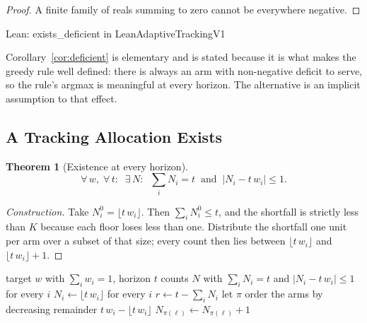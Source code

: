 \documentclass[conference]{IEEEtran}
\newtheorem{theorem}{Theorem}
\theoremstyle{definition}
\newcommand{\lean}[1]{\textsf{\footnotesize #1}}
\newcommand{\leanbox}[1]{%
  \par\vspace{2pt}\noindent
  {\footnotesize\textsf{Lean: #1}}\par\vspace{2pt}}
\begin{document}
\begin{proof}
A finite family of reals summing to zero cannot be everywhere negative.
\end{proof}

\leanbox{\lean{exists\_deficient} in \lean{LeanAdaptiveTrackingV1}}

Corollary~\ref{cor:deficient} is elementary and is stated because it is what makes the greedy
rule well defined: there is always an arm with non-negative deficit to serve, so the rule's
argmax is meaningful at every horizon. The alternative is an implicit assumption to that
effect.

\subsection{A Tracking Allocation Exists}
\label{sec:exists}

\begin{theorem}[Existence at every horizon]
\label{thm:exists}
\begin{equation}
\forall\,w,\;\forall\,t:\;\;
\exists\,N:\;\;\sum_{i} N_{i}=t
\;\;\text{and}\;\;\bigl|N_{i}-t\,w_{i}\bigr|\leq 1 .
\label{eq:exists}
\end{equation}
\end{theorem}

\begin{proof}[Construction]
Take $N_{i}^{0}=\lfloor t\,w_{i}\rfloor$. Then $\sum_{i}N_{i}^{0}\le t$, and the shortfall is
strictly less than $K$ because each floor loses less than one. Distribute the shortfall one
unit per arm over a subset of that size; every count then lies between
$\lfloor t\,w_{i}\rfloor$ and $\lfloor t\,w_{i}\rfloor+1$.
\end{proof}

\begin{algorithm}[htbp]
\caption{Offline allocation meeting the quota bound at a fixed horizon}
\label{alg:offline}
\begin{algorithmic}[1]
\REQUIRE target $w$ with $\sum_{i}w_{i}=1$, horizon $t$
\ENSURE counts $N$ with $\sum_{i}N_{i}=t$ and $|N_{i}-t\,w_{i}|\le1$ for every $i$
\STATE $N_{i}\leftarrow\lfloor t\,w_{i}\rfloor$ for every $i$
\STATE $r\leftarrow t-\sum_{i}N_{i}$ 
\STATE let $\pi$ order the arms by decreasing remainder $t\,w_{i}-\lfloor t\,w_{i}\rfloor$
  \STATE $N_{\pi(\ell)}\leftarrow N_{\pi(\ell)}+1$
\ENDFOR
\end{algorithmic}
\end{algorithm}
\end{document}
